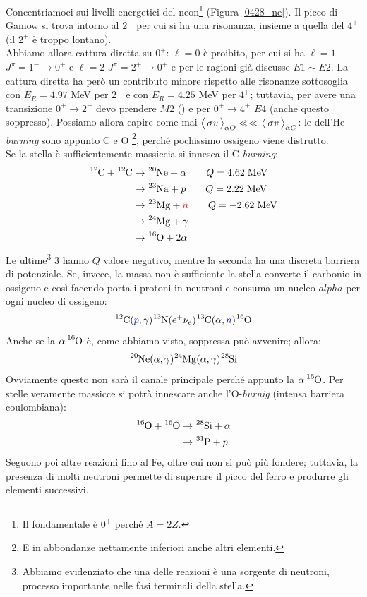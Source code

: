 \noindent Concentriamoci sui livelli energetici del neon\footnote{Il fondamentale è $0^+$ perché $A=2Z$.} (Figura \ref{0428_ne}). Il picco di Gamow si trova intorno al $2^-$ per cui si ha una risonanza, insieme a quella del $4^+$ (il $2^+$ è troppo lontano).\\ 
Abbiamo allora cattura diretta su $0^+$: $\ell=0$ è proibito, per cui si ha $\ell=1$ $J^\pi=1^-\to0^+$ e $\ell=2$ $J^\pi=2^+\to0^+$ e per le ragioni già discusse $E1\sim E2$. La cattura diretta ha però un contributo minore rispetto alle risonanze sottosoglia con $E_R =4.97$ MeV per $2^-$ e con $E_R =4.25$ MeV per $4^+$; tuttavia, per avere una transizione $0^+\to2^-$ devo prendere $M2$ () e per $0^+\to4^+$ $E4$ (anche questo soppresso). Possiamo allora capire come mai $\bigl\langle\, \sigma v\, \bigr\rangle_{\alpha O}\ll\ll\bigl\langle\, \sigma v\, \bigr\rangle_{\alpha C}$: le  dell'He-\textit{burning} sono appunto C e O \footnote{E in abbondanze nettamente inferiori anche altri elementi.}, perché pochissimo ossigeno viene distrutto. \\ 
Se la stella è sufficientemente massiccia si innesca il C-\textit{burning}:
\begin{align*}
	\ce{^{12}C} +\ce{^{12}C} &\to \ce{^{20}Ne}+ \alpha \qquad Q=4.62 \unit{MeV} \\
	&\to \ce{^{23}Na}+ p \qquad Q=2.22 \unit{MeV} \\ 
	&\to \ce{^{23}Mg}+ \textcolor{red}{n} \qquad Q=-2.62 \unit{MeV} \\ 
	&\to \ce{^{24}Mg}+ \gamma \\ 
	&\to \ce{^{16}O}+ 2\alpha  
\end{align*}
Le ultime\footnote{Abbiamo evidenziato che una delle reazioni è una sorgente di neutroni, processo importante nelle fasi terminali della stella.} 3 hanno $Q$ valore negativo, mentre la seconda ha una discreta barriera di potenziale. Se, invece, la massa non è sufficiente la stella converte il carbonio in ossigeno e così facendo porta i protoni in neutroni e consuma un nucleo $alpha$ per ogni nucleo di ossigeno:
$$\ce{^{12}C}(\textcolor{blue}{p},\gamma)\ce{^{13}N}(e^+\nu_e)\ce{^{13}C}(\alpha,\textcolor{blue}{n})\ce{^{16}O}$$
Anche se la $\alpha \, \ce{^{16}O}$ è, come abbiamo visto, soppressa può avvenire; allora:
$$\ce{^{20}Ne}(\alpha,\gamma)\ce{^{24}Mg}(\alpha,\gamma)\ce{^{28}Si}$$
Ovviamente questo non sarà il canale principale perché appunto la $\alpha \, \ce{^{16}O}$. Per stelle veramente massicce si potrà innescare anche l'O-\textit{burnig} (intensa barriera coulombiana):
\begin{align*}
	\ce{^{16}O} + \ce{^{16}O} &\to \ce{^{28}Si} +\alpha \\
	&\to \ce{^{31}P} + p
\end{align*}
Seguono poi altre reazioni fino al Fe, oltre cui non si può più fondere; tuttavia, la presenza di molti neutroni permette di superare il picco del ferro e produrre gli elementi successivi.


